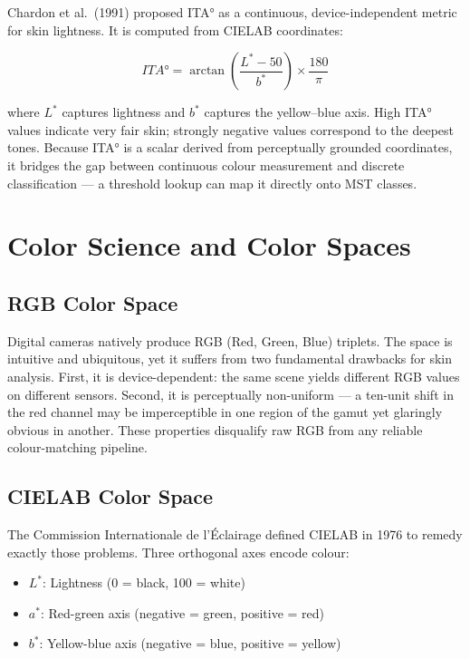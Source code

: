 Chardon et al.\ (1991) proposed ITA° as a continuous, device-independent metric for skin lightness. It is computed from CIELAB coordinates:

\begin{equation}
ITA° = \arctan\left(\frac{L^* - 50}{b^*}\right) \times \frac{180}{\pi}
\end{equation}

where $L^*$ captures lightness and $b^*$ captures the yellow–blue axis. High ITA° values indicate very fair skin; strongly negative values correspond to the deepest tones. Because ITA° is a scalar derived from perceptually grounded coordinates, it bridges the gap between continuous colour measurement and discrete classification — a threshold lookup can map it directly onto MST classes.

\section{Color Science and Color Spaces}

\subsection{RGB Color Space}

Digital cameras natively produce RGB (Red, Green, Blue) triplets. The space is intuitive and ubiquitous, yet it suffers from two fundamental drawbacks for skin analysis. First, it is device-dependent: the same scene yields different RGB values on different sensors. Second, it is perceptually non-uniform — a ten-unit shift in the red channel may be imperceptible in one region of the gamut yet glaringly obvious in another. These properties disqualify raw RGB from any reliable colour-matching pipeline.

\subsection{CIELAB Color Space}

The Commission Internationale de l'Éclairage defined CIELAB in 1976 to remedy exactly those problems. Three orthogonal axes encode colour:

\begin{itemize}
    \item $L^*$: Lightness (0 = black, 100 = white)
    \item $a^*$: Red-green axis (negative = green, positive = red)
    \item $b^*$: Yellow-blue axis (negative = blue, positive = yellow)
\end{itemize}

